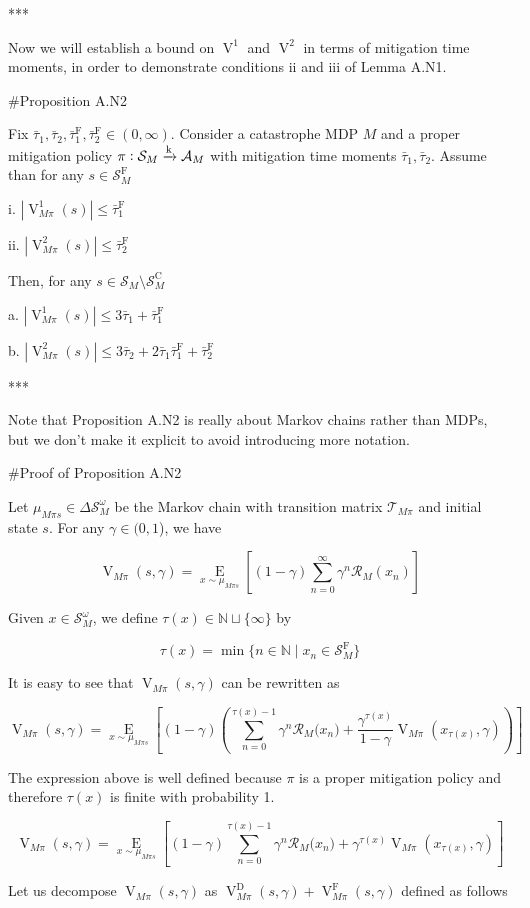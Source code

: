 \documentclass[a4paper]{article}
\newcommand{\AP}[1]{\left(#1\right)}
\newcommand{\AB}[1]{\left[#1\right]}
\newcommand{\Ea}[2]{\underset{#1}{\operatorname{E}}\AB{#2}}
\newcommand{\Nats}{\mathbb{N}}
\newcommand{\Abs}[1]{\left\vert #1 \right\vert}
\newcommand{\M}{\xrightarrow{\textnormal{k}}}
\newcommand{\A}{\mathcal{A}}
\newcommand{\St}{\mathcal{S}}
\newcommand{\T}{\mathcal{T}}
\newcommand{\R}{\mathcal{R}}
\newcommand{\RMC}{\mathrm{C}}
\newcommand{\RMD}{\mathrm{D}}
\newcommand{\RMF}{\mathrm{F}}
\newcommand{\SF}{\St^{\RMF}}
\newcommand{\SC}{\St^{\RMC}}
\newcommand{\TF}{\bar{\tau}^{\RMF}}
\newcommand{\V}{\operatorname{V}}
\begin{document}
***

Now we will establish a bound on $\V^1$ and $\V^2$ in terms of mitigation time moments, in order to demonstrate conditions ii and iii of Lemma A.N1.

\#Proposition A.N2

Fix $\bar{\tau}_1, \bar{\tau}_2, \TF_1, \TF_2 \in (0,\infty)$. Consider a catastrophe MDP $M$ and a proper mitigation policy $\pi: \St_M \M \A_M$ with mitigation time moments $\bar{\tau}_1, \bar{\tau}_2$. Assume than for any $s \in \SF_M$

i. $\Abs{\V^1_{M\pi}(s)} \leq \TF_1$

ii. $\Abs{\V^2_{M\pi}(s)} \leq \TF_2$

Then, for any $s \in \St_M \setminus \SC_M$

a. $\Abs{\V^1_{M\pi}(s)} \leq 3 \bar{\tau}_1 + \TF_1$

b. $\Abs{\V^2_{M\pi}(s)} \leq 3 \bar{\tau}_2 + 2 \bar{\tau}_1 \TF_1 + \TF_2$

***

Note that Proposition A.N2 is really about Markov chains rather than MDPs, but we don't make it explicit to avoid introducing more notation.

\#Proof of Proposition A.N2

Let $\mu_{M\pi s}\in\Delta\St_M^\omega$ be the Markov chain with transition matrix $\T_{M\pi}$ and initial state $s$. For any $\gamma\in(0,1$), we have

$$\V_{M\pi}(s,\gamma) = \Ea{x\sim\mu_{M\pi s}}{(1-\gamma)\sum_{n=0}^\infty \gamma^n \R_M\AP{x_n}}$$

Given $x\in\St_M^\omega$, we define $\tau(x) \in \Nats \sqcup \{\infty\}$ by 

$$\tau(x)=\min\{n \in \Nats \mid x_n \in \SF_M\}$$

It is easy to see that $\V_{M\pi}(s,\gamma)$ can be rewritten as

$$\V_{M\pi}(s,\gamma) = \Ea{x\sim\mu_{M\pi s}}{(1-\gamma)\AP{\sum_{n=0}^{\tau(x)-1} \gamma^n \R_M\Big(x_n\Big) + \frac{\gamma^{\tau(x)}}{1-\gamma}\V_{M\pi}\AP{x_{\tau(x)},\gamma}}}$$

The expression above is well defined because $\pi$ is a proper mitigation policy and therefore $\tau(x)$ is finite with probability 1.

$$\V_{M\pi}(s,\gamma) = \Ea{x\sim\mu_{M\pi s}}{(1-\gamma)\sum_{n=0}^{\tau(x)-1} \gamma^n \R_M\Big(x_n\Big) + \gamma^{\tau(x)}\V_{M\pi}\AP{x_{\tau(x)},\gamma}}$$

Let us decompose $\V_{M\pi}(s,\gamma)$ as $\V_{M\pi}^\RMD(s,\gamma)+\V_{M\pi}^\RMF(s,\gamma)$ defined as follows
\end{document}
